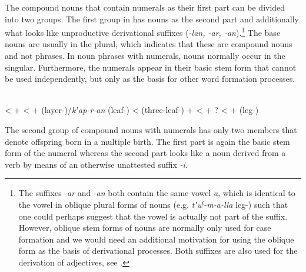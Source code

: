 %

The compound nouns that contain numerals as their first part can be divided into two groups. The first group in  has nouns as the second part and additionally what looks like unproductive derivational suffixes (\textit{-lan, -ar, -an}).\footnote{The suffixes -\textit{ar} and -\textit{an} both contain the same vowel \textit{a}, which is identical to the vowel in oblique plural forms of nouns (e.g. \textit{tʼuˁ-m-a-lla} leg-) such that one could perhaps suggest that the vowel is actually not part of the suffix. However, oblique stem forms of nouns are normally only used for case formation and we would need an additional motivation for using the oblique form as the basis of derivational processes. Both suffixes are also used for the derivation of adjectives, see .} The base nouns are usually in the plural, which indicates that these are compound nouns and not phrases. In noun phrases with numerals, nouns normally occur in the singular. Furthermore, the numerals appear in their basic stem form that cannot be used independently, but only as the basis for other word formation processes. 

\begin{exe}
	\ex	\label{ex:CompoundNounsNumeralsNouns} 
	\begin{xlist}
		\TabPositions{2em,4em}
			\ex	{}			\\
			\tab	<	\tab	 {}  +  										
			\ex	{}			\tab	<	\tab	 {}  +  (layer-)\slash\textit{kʼap-r-an} (leaf-)
			\ex	{}			\tab	<	\tab	 {} (three-leaf-) +  
			\ex	{}			\tab	<	\tab	{}  + ?	
			\ex	{}			\tab	<	\tab	{}  +  (leg-)						
	\end{xlist}
\end{exe}	

The second group of compound nouns with numerals has only two members  that denote offspring born in a multiple birth. The first part is again the basic stem form of the numeral whereas the second part looks like a noun derived from a verb by means of an otherwise unattested suffix \textit{-i}.

